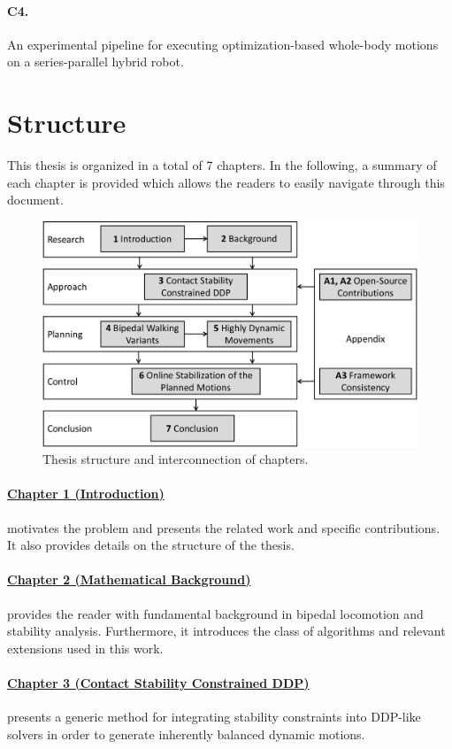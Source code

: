 \paragraph{C4.} An experimental pipeline for executing optimization-based whole-body motions on a series-parallel hybrid robot.  

\section{Structure}
This thesis is organized in a total of 7 chapters. 
In the following, a summary of each chapter is provided which allows the readers to easily navigate through this document.

\begin{figure}
\centering	
\includegraphics[width=.8\textwidth]{img/structure2}
\caption[Thesis structure and interconnection of chapters]{Thesis structure and interconnection of chapters.}
\label{img:structure}
\end{figure}

\paragraph{\hyperref[c1]{Chapter 1 (Introduction)}} motivates the problem and presents the related work and specific contributions. It also provides details on the structure of the thesis.
\paragraph{\hyperref[c2]{Chapter 2 (Mathematical Background)}} provides the reader with fundamental background in bipedal locomotion and stability analysis. Furthermore, it introduces the class of algorithms and relevant extensions used in this work.
\paragraph{\hyperref[c3]{Chapter 3 (Contact Stability Constrained DDP)}} presents a generic method for integrating stability constraints into DDP-like solvers in order to generate inherently balanced dynamic motions.
